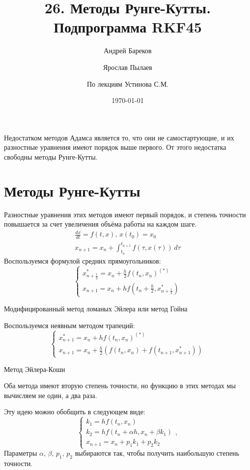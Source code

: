 \documentclass[a4paper,11pt]{article}
\title{26. Методы Рунге-Кутты. Подпрограмма \textbf{RKF45}}
\author{Андрей Бареков \and Ярослав Пылаев \and По лекциям Устинова С.М.}
\date{\today}
\begin{document}
\maketitle
\newpage

\noindent Недостатком методов Адамса является то, что они не самостартующие, и их разностные уравнения имеют порядок выше первого.
  От этого недостатка свободны методы Рунге-Кутты.

\section{Методы Рунге-Кутты}
Разностные уравнения этих методов имеют первый порядок\footnotemark, и степень точности повышается за счет увеличения объёма работы на каждом шаге.
\begin{gather}
  \frac{dx}{dt} = f(t, x),\, x(t_0) = x_0 \\
  x_{n+1} = x_n + \int_{t_n}^{t_{n+1}} f(\tau, x(\tau))\,d\tau
\end{gather}
Воспользуемся формулой средних прямоугольников: \\
\begin{equation}
  \begin{cases}
    x_{n+\frac{1}{2}}^* = x_n + \frac{h}{2} f(t_n, x_n)^{(*)} \\
    x_{n+1} = x_n + hf(t_n + \frac{h}{2}, x_{n+\frac{1}{2}}^*)
  \end{cases}
  \label{eq:HM}
\end{equation}
\begin{center}
  \small{Модифицированный метод ломаных Эйлера или метод Гойна}
\end{center}
Воспользуемся неявным методом трапеций:
\begin{equation}
  \begin{cases}
    x_{n+1}^* = x_n + hf(t_n, x_n)^{(*)} \\
    x_{n+1} = x_n + \frac{h}{2}(f(t_n, x_n) + f(t_{n+1}, x_{n+1}^*))
  \end{cases}
  \label{eq:ECM}
\end{equation}
\begin{center}
  \small{Метод Эйлера-Коши}
\end{center}
Оба метода имеют вторую степень точности, но функцию в этих методах мы вычисляем не один, а два раза. \\
\begin{importantblock}
  Эту идею можно обобщить в следующем виде:
  \begin{equation}
    \begin{cases}
      k_1 = hf(t_n, x_n) \\
      k_2 = hf(t_n + \alpha h, x_n + \beta k_1) \\
      x_{n+1} = x_n + p_1k_1 + p_2k_2
    \end{cases},
    \label{eq:RKM}
  \end{equation}
  Параметры $\alpha,\, \beta,\, p_1,\, p_2$ выбираются так, чтобы получить наибольшую степень точности.
\end{importantblock}
\end{document}

